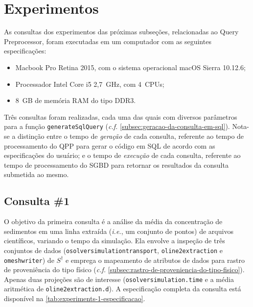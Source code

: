 \section{Experimentos}

As consultas dos experimentos das próximas subseções, relacionadas ao Query Preprocessor, foram executadas em um computador com as seguintes especificações:

\begin{itemize}
	\item Macbook Pro Retina 2015, com o sistema operacional macOS Sierra 10.12.6;
    \item Processador Intel Core i5 2,7~GHz, com 4~CPUs;
    \item 8~GB de memória RAM do tipo DDR3.
\end{itemize}

Três consultas foram realizadas, cada uma das quais com diversos parâmetros para a função \texttt{generateSqlQuery} (\textit{c.f.} \autoref{subsec:geracao-da-consulta-em-sql}). Nota-se a distinção entre o tempo de \emph{geração} de cada consulta, referente ao tempo de processamento do QPP para gerar o código em SQL de acordo com as especificações do usuário; e o tempo de \emph{execução} de cada consulta, referente ao tempo de processamento do SGBD para retornar os resultados da consulta submetida ao mesmo.

\subsection{Consulta \#1}

%

%

O objetivo da primeira consulta é a análise da média da concentração de sedimentos em uma linha extraída (\textit{i.e.}, um conjunto de pontos) de arquivos científicos, variando o tempo da simulação. Ela envolve a inspeção de três conjuntos de dados (\texttt{osolversimulationtransport}, \texttt{oline2extraction} e \texttt{omeshwriter}) de \(S^{\dagger}\) e emprega o mapeamento de atributos de dados para rastro de proveniência do tipo físico (\textit{c.f.} \autoref{subsec:rastro-de-proveniencia-do-tipo-fisico}). Apenas duas projeções são de interesse (\texttt{osolversimulation.time} e a média aritmética de \texttt{oline2extraction.d}). A especificação completa da consulta está disponível na \autoref{tab:experiments-1-especificacao}.

